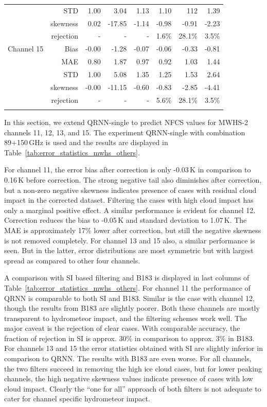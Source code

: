 \documentclass[amt, manuscript]{copernicus}
\begin{document}
\begin{table}[t]
\begin{tabular}{lrrr|rr|rr}
					& STD       &  1.00 &   3.04 &  1.13 &  1.10  		&  112  &	1.39 \\
					& skewness  &  0.02 & -17.85 & -1.14 & -0.98  		& -0.91  & -2.23 \\	
					& rejection   & -    & -      & -	  & 1.6\%        & 28.1\% & 3.5\%  \\	
		\middlehline
		Channel 15  & Bias      & -0.00 &  -1.28 & -0.07 & -0.06        & -0.33 &  -0.81 \\
					& MAE       &  0.80 &   1.87 &  0.97 &  0.92 		&  1.03 &	1.44 \\
					& STD       &  1.00 &   5.08 &  1.35 &  1.25 		&  1.53 &	2.64 \\
					& skewness  & -0.00 & -11.15 & -0.60 & -0.83 		& -2.85 &  -4.41 \\ 
					& rejection & -     & -      & -	 & 5.6\%        & 28.1\% & 3.5\%  \\
		\bottomhline
	\end{tabular}
\end{table}

In this section, we extend QRNN-single to predict NFCS values for MWHS-2 channels 11, 12, 13, and 15. The experiment QRNN-single with combination 89+150\,GHz is used and the results are displayed in Table~\ref{tab:error_statistics_mwhs_others}.

For channel 11, the error bias after correction is only -0.03\,K in comparison to 0.16\,K before correction. The strong negative tail also diminishes after correction, but a non-zero negative skewness indicates presence of cases with residual cloud impact in the corrected dataset. Filtering the cases with high cloud impact has only a marginal positive effect. A similar performance is evident for channel 12. Correction reduces the bias to -0.05\,K and standard deviation to 1.07\,K. The MAE is approximately 17\% lower after correction, but still the negative skewness is not removed completely. For channel 13 and 15 also, a similar performance is seen. But in the latter, error distributions are most symmetric but with largest spread as compared to other four channels.

A comparison with SI based filtering and B183 is displayed in last columns of Table~\ref{tab:error_statistics_mwhs_others}. For channel 11 the performance of QRNN is comparable to both SI and B183. Similar is the case with channel 12, though the results from B183 are slightly poorer. Both these channels are mostly transparent to hydrometeor impact, and the filtering schemes work well. The major caveat is the rejection of clear cases. With comparable accuracy, the fraction of rejection in SI is approx. 30\% in comparison to approx. 3\% in B183. For channels 13 and 15 the error statistics obtained with SI are slightly inferior in comparison to QRNN. The results with B183 are even worse. For all channels, the two filters succeed in removing the high ice cloud cases, but for lower peaking channels, the high negative skewness values indicate presence of cases with low cloud impact. Clearly the ``one for all'' approach of both filters is not adequate to cater for channel specific hydrometeor impact.  
\end{document}
